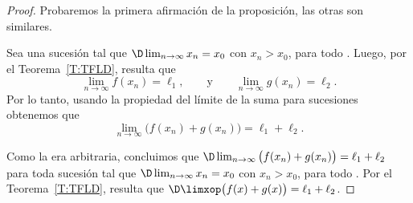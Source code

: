 \begin{proof}
Probaremos la primera afirmación de la proposición, las otras son similares.

    Sea \sucxn una sucesión tal que $\D\lim_{n\to\infty} x_n = x_0$ con $x_n > x_0$, para todo \niN.
    Luego, por el Teorema~\ref{T:TFLD}, resulta que
    \[
    \lim_{n\to\infty } f(x_n) = \ell_1,
    \qquad\text{y}\qquad
    \lim_{n\to\infty } g(x_n) = \ell_2.
    \]
    Por lo tanto, usando la propiedad del límite de la suma para sucesiones obtenemos que
    \[
    \lim_{n\to\infty } \big(f(x_n) + g(x_n)\big) = \ell_1+\ell_2.
    \]

    Como la \sucxn era arbitraria, concluimos que $\D  \lim_{n\to\infty } \big(f(x_n) + g(x_n)\big) = \ell_1+\ell_2$
    para toda sucesión \sucxn tal que $\D\lim_{n\to\infty} x_n = x_0$ con $x_n > x_0$, para todo \niN.
    Por el Teorema~\ref{T:TFLD}, resulta que $\D\limxop \big(f(x)+g(x)\big) = \ell_1+\ell_2$.
\end{proof}
